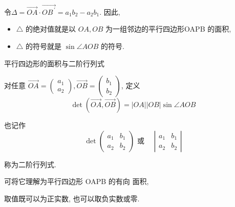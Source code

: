 \documentclass[10pt,punct]{ctexbeamer}
\begin{document}
\begin{frame}
\begin{columns}[c]
    \end{columns}
        \pause
 令$\Delta=\overrightarrow{O A} \cdot \overrightarrow{O B^{\, \prime}}=a_1 b_2-a_2 b_1$. 因此,

\begin{itemize}
    \item  $\triangle$ 的\alert{绝对值}就是以 $O A, O B$ 为一组邻边的平行四边形OAPB 的面积,
    \item   $\triangle$ 的\alert{符号}就是 $\sin \angle A O B$ 的符号.
\end{itemize}
\end{frame}

\begin{frame}{平行四边形的面积与二阶行列式}


    对任意 $\overrightarrow{O A}=\left(\begin{array}{l}a_1 \\ a_2\end{array}\right), \overrightarrow{O B}=\left(\begin{array}{l}b_1 \\ b_2\end{array}\right)$, 定义 $$\operatorname{det}(\overrightarrow{O A}, \overrightarrow{O B})=|O A||O B| \sin \angle A O B$$

    也记作
    $$\operatorname{det}\left(\begin{array}{ll}a_1 & b_1 \\ a_2 & b_2\end{array}\right) \mbox{ 或  } \quad \left|\begin{array}{ll}a_1 & b_1 \\ a_2 & b_2\end{array}\right|$$


    称为\alert{二阶行列式}.

    可将它理解为平行四边形 OAPB 的\alert{有向 面积},

    取值既可以为正实数, 也可以取负实数或零.
\end{frame}
\end{document}
